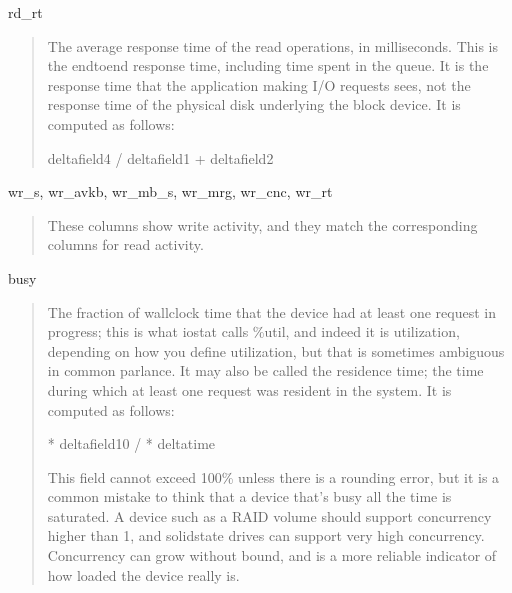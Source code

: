 \documentclass[letterpaper,10pt,english]{sphinxmanual}
\begin{document}
\sphinxAtStartPar
rd\_rt
\begin{quote}

\sphinxAtStartPar
The average response time of the read operations, in milliseconds.  This is the
end\sphinxhyphen{}to\sphinxhyphen{}end response time, including time spent in the queue.  It is the response
time that the application making I/O requests sees, not the response time of the
physical disk underlying the block device.  It is computed as follows:

\begin{sphinxVerbatim}[commandchars=\\\{\}]
delta\PYG{o}{[}field4\PYG{o}{]} / delta\PYG{o}{[}field1\PYG{o}{]} + delta\PYG{o}{[}field2\PYG{o}{]}
\end{sphinxVerbatim}
\end{quote}

\sphinxAtStartPar
wr\_s, wr\_avkb, wr\_mb\_s, wr\_mrg, wr\_cnc, wr\_rt
\begin{quote}

\sphinxAtStartPar
These columns show write activity, and they match the corresponding columns for
read activity.
\end{quote}

\sphinxAtStartPar
busy
\begin{quote}

\sphinxAtStartPar
The fraction of wall\sphinxhyphen{}clock time that the device had at least one request in
progress; this is what iostat calls \%util, and indeed it is utilization,
depending on how you define utilization, but that is sometimes ambiguous in
common parlance.  It may also be called the residence time; the time during
which at least one request was resident in the system.  It is computed as
follows:

\begin{sphinxVerbatim}[commandchars=\\\{\}]
 * delta\PYG{o}{[}field10\PYG{o}{]} /  * delta\PYG{o}{[}time\PYG{o}{]}
\end{sphinxVerbatim}

\sphinxAtStartPar
This field cannot exceed 100\% unless there is a rounding error, but it is a
common mistake to think that a device that’s busy all the time is saturated.  A
device such as a RAID volume should support concurrency higher than 1, and
solid\sphinxhyphen{}state drives can support very high concurrency.  Concurrency can grow
without bound, and is a more reliable indicator of how loaded the device really
is.
\end{quote}
\end{document}
